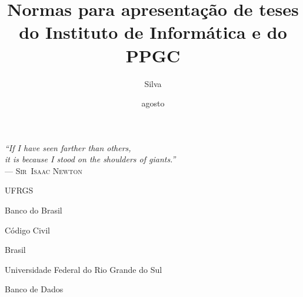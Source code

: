 \documentclass[ppgc,diss]{iiufrgs}
\title{
    Normas para apresentação de teses do Instituto de Informática e do PPGC
}
\author{Silva}{João da}
\date{agosto}{2014}
\begin{document}
\maketitle

\clearpage
\begin{flushright}
\mbox{}\vfill
{\sffamily\itshape
``If I have seen farther than others,\\
it is because I stood on the shoulders of giants.''\\}
--- \textsc{Sir~Isaac Newton}
\end{flushright}








\listoffigures
\listoftables
\begin{listofabbrv}{UFRGS}
    \item[BB] Banco do Brasil
    \item[CC] Código Civil
    \item[BR] Brasil
    \item[UFRGS] Universidade Federal do Rio Grande do Sul
    \item[BD] Banco de Dados
\end{listofabbrv}
\tableofcontents















\end{document}
